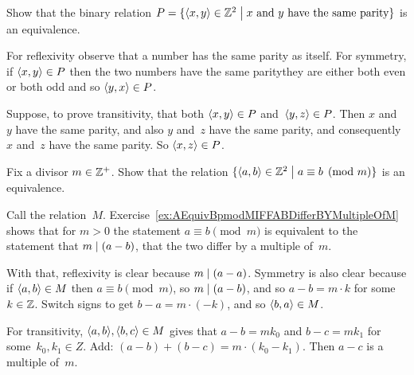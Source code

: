 \documentclass{ibl}  %
\begin{document}
\begin{problem}[\midlength]
Show that the binary relation 
$P=\{\langle x,y\rangle\in\mathbb{Z}^2 \bigm| \text{$x$ and $y$ have the same parity}\}$
is an equivalence.
\begin{answer}
For reflexivity observe that a number has the same parity as itself.
For symmetry, if $\langle x,y\rangle\in P$ then
the two numbers have the same parity\Dash they 
are either both even or both odd\Dash
and so $\langle y,x\rangle\in P$.

Suppose, to prove transitivity, that both $\langle x,y\rangle\in P$ 
and~$\langle y,z\rangle\in P$.
Then $x$ and~$y$ have the same parity, and also $y$ and~$z$ have the same
parity, and consequently $x$ and~$z$ have the same parity.
So $\langle x,z\rangle\in P$.  
\end{answer}
\end{problem}

\begin{problem}  \label{ex:EquivModMIsEquivalenceRelation}
Fix a divisor $m\in\mathbb{Z}^+$.
Show that the relation 
$\{\langle a,b\rangle\in\mathbb{Z}^2 \bigm| a\equiv b\pmod m\}$  
is an equivalence.
\begin{answer}
  Call the relation~$M$.
  Exercise~\ref{ex:AEquivBpmodMIFFABDifferBYMultipleOfM}
  shows that for $m>0$ the statement $a\equiv b\pmod m$
  is equivalent to the statement that $m\mid (a-b)$, that
  the two differ by a multiple of~$m$.

  With that, reflexivity is clear because $m\mid (a-a)$.
  Symmetry is also clear because if $\langle a,b\rangle\in M$ 
  then $a\equiv b\pmod m$, so
  $m\mid (a-b)$, and so $a-b=m\cdot k$ for some~$k\in\mathbb{Z}$.
  Switch signs to get $b-a=m\cdot(-k)$, and so $\langle b,a\rangle\in M$.

  For transitivity, $\langle a,b\rangle, \langle b,c\rangle\in M$ gives that
  $a-b=mk_0$ and $b-c=mk_1$ for some~$k_0,k_1\in Z$.
  Add: $(a-b)+(b-c)=m\cdot(k_0-k_1)$. 
  Then $a-c$ is a multiple of~$m$.
\end{answer}
\end{problem}
\end{document}
